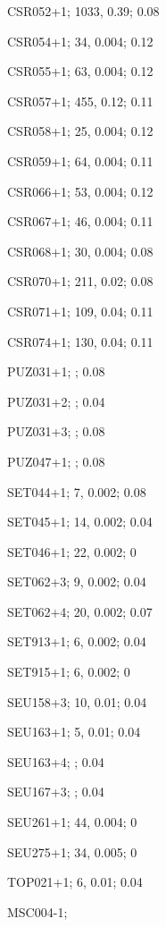 CSR052+1; 1033, 0.39; 0.08

CSR054+1; 34, 0.004; 0.12

CSR055+1; 63, 0.004; 0.12

CSR057+1; 455, 0.12; 0.11

CSR058+1; 25, 0.004; 0.12

CSR059+1; 64, 0.004; 0.11

CSR066+1; 53, 0.004; 0.12

CSR067+1; 46, 0.004; 0.11

CSR068+1; 30, 0.004; 0.08

CSR070+1; 211, 0.02; 0.08

CSR071+1; 109, 0.04; 0.11

CSR074+1; 130, 0.04; 0.11




PUZ031+1;	; 0.08

PUZ031+2;	; 0.04

PUZ031+3;	; 0.08

PUZ047+1;	; 0.08




SET044+1; 7, 0.002; 0.08

SET045+1; 14, 0.002; 0.04

SET046+1; 22, 0.002; 0

SET062+3; 9, 0.002; 0.04

SET062+4; 20, 0.002; 0.07

SET913+1; 6, 0.002; 0.04

SET915+1; 6, 0.002; 0



SEU158+3; 10, 0.01; 0.04

SEU163+1; 5, 0.01; 0.04

SEU163+4; ; 0.04

SEU167+3; ; 0.04

SEU261+1; 44, 0.004; 0

SEU275+1; 34, 0.005; 0



TOP021+1; 6, 0.01; 0.04

MSC004-1;

